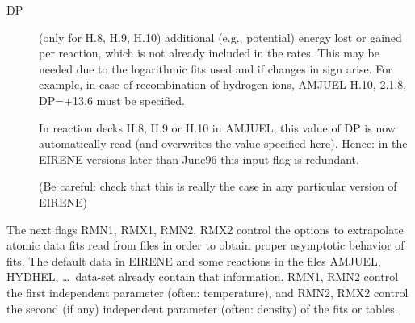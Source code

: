 \medskip

\begin{description}
  \item[DP] (only for H.8, H.9, H.10) additional (e.g., potential) energy lost or
        gained per reaction, which is not already included in the rates.
        This may be needed due to the logarithmic fits used and if changes in sign
        arise.
        For example, in case of recombination of hydrogen ions, AMJUEL H.10, 2.1.8,
        DP=+13.6 must be specified.

        In reaction decks H.8, H.9 or H.10 in AMJUEL, this value of DP is now
        automatically read (and overwrites the value specified here).
        Hence: in the EIRENE versions later than June96 this input flag is redundant.

        (Be careful: check that this is really the case in any particular version of
        EIRENE) 

\end{description}
The next flags RMN1, RMX1, RMN2, RMX2 control the options to
extrapolate atomic data fits read from files in order to obtain proper
asymptotic behavior of fits.
The default data in EIRENE and some reactions in the files AMJUEL, HYDHEL,
\dots\ data-set already contain that information.
RMN1, RMN2 control the first independent parameter (often: temperature), and
RMN2, RMX2 control the second (if any) independent parameter (often: density)
of the fits or tables.

